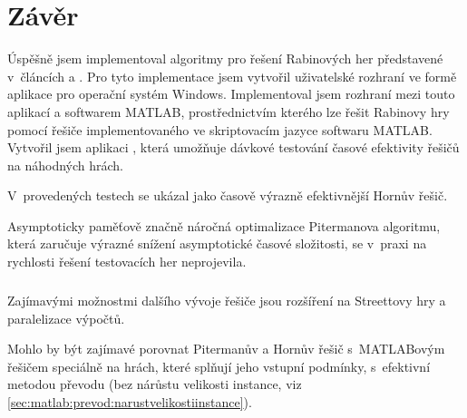 \chapter{Závěr} \label{chap:conclusions}
Úspěšně jsem implementoval algoritmy pro řešení Rabinových her představené v~článcích \cite{Piterman2006} a \cite{Horn2005}. Pro tyto implementace jsem vytvořil uživatelské rozhraní ve formě aplikace \rgsexe{} pro operační systém Windows. Implementoval jsem rozhraní mezi touto aplikací a softwarem MATLAB, prostřednictvím kterého lze řešit Rabinovy hry pomocí řešiče implementovaného ve skriptovacím jazyce softwaru MATLAB. Vytvořil jsem aplikaci \benchexe, která umožňuje dávkové testování časové efektivity řešičů na náhodných hrách.

V~provedených testech se ukázal jako časově výrazně efektivnější Hornův řešič.

Asymptoticky paměťově značně náročná optimalizace Pitermanova algoritmu, která zaručuje výrazné snížení asymptotické časové složitosti, se v~praxi na rychlosti řešení testovacích her neprojevila.
\paragraph{}
Zajímavými možnostmi dalšího vývoje řešiče jsou rozšíření na Streettovy hry a paralelizace výpočtů.

Mohlo by být zajímavé porovnat Pitermanův a Hornův řešič s~MATLABovým řešičem speciálně na hrách, které splňují jeho vstupní podmínky, s~efektivní metodou převodu (bez nárůstu velikosti instance, viz \ref{sec:matlab:prevod:narustvelikostiinstance}).